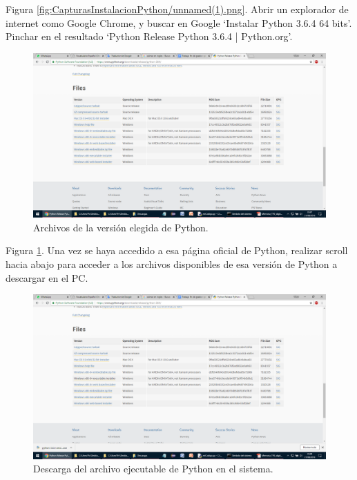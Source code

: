 Figura \ref{fig:CapturasInstalacionPython/unnamed(1).png}. Abrir un explorador de internet como Google Chrome, y buscar en Google ‘Instalar Python 3.6.4 64 bits’. Pinchar en el resultado ‘Python Release Python 3.6.4 | Python.org’.\\[20pt]

\begin{figure}[h!]
  	\centering
	\includegraphics[width=\textwidth]{CapturasInstalacionPython/unnamed(2).png}
	\caption{Archivos de la versión elegida de Python.
	\label{fig:CapturasInstalacionPython/unnamed(2).png}}
\end{figure}

Figura \ref{fig:CapturasInstalacionPython/unnamed(2).png}. Una vez se haya accedido a esa página oficial de Python, realizar scroll hacia abajo para acceder a los archivos disponibles de esa versión de Python a descargar en el PC.\\[20pt]

\begin{figure}[h!]
  	\centering
	\includegraphics[width=\textwidth]{CapturasInstalacionPython/unnamed(3).png}
	\caption{Descarga del archivo ejecutable de Python en el sistema.
	\label{fig:CapturasInstalacionPython/unnamed(3).png}}
\end{figure}


